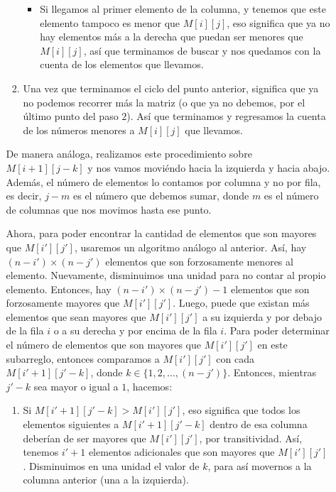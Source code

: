 \documentclass[letterpaper,11pt]{article}
\begin{document}
\begin{enumerate}
\begin{enumerate}
\begin{enumerate}
\begin{itemize}
                \item Si llegamos al primer elemento de la columna, y tenemos 
                que este elemento tampoco es menor que $M[i][j]$, eso significa 
                que ya no hay elementos más a la derecha que puedan ser menores 
                que $M[i][j]$, así que terminamos de buscar y nos quedamos con 
                la cuenta de los elementos que llevamos. 
            \end{itemize}

            \item Una vez que terminamos el ciclo del punto anterior, significa 
            que ya no podemos recorrer más la matriz (o que ya no debemos, por 
            el último punto del paso $2$). Así que terminamos y regresamos la 
            cuenta de los números menores a $M[i][j]$ que llevamos.
        \end{enumerate}

        De manera análoga, realizamos este procedimiento sobre $M[i+1][j-k]$ y
        nos vamos moviéndo hacia la izquierda y hacia abajo. Además, el número 
        de elementos lo contamos por columna y no por fila, es decir, $j-m$
        es el número que debemos sumar, donde $m$ es el número de columnas que 
        nos movimos hasta ese punto.

        Ahora, para poder encontrar la cantidad de elementos que son mayores que
        $M[i'][j']$, usaremos un algoritmo análogo al anterior. Así, hay 
        $(n-i') \times (n-j')$ elementos que son forzosamente menores al 
        elemento. Nuevamente, disminuimos una unidad para no contar al propio 
        elemento. Entonces, hay $(n-i') \times (n-j') - 1$ elementos que son 
        forzosamente mayores que $M[i'][j']$. Luego, puede que existan más 
        elementos que sean mayores que $M[i'][j']$ a su izquierda y por debajo 
        de la fila $i$ o a su derecha y por encima de la fila $i$. Para poder 
        determinar el número de elementos que son mayores que $M[i'][j']$ en 
        este subarreglo, entonces comparamos a $M[i'][j']$ con cada 
        $M[i'+1][j'-k]$, donde $k \in \{1, 2, \ldots, (n-j')\}$. Entonces, 
        mientras $j'-k$ sea mayor o igual a $1$, hacemos:  
        \begin{enumerate}
            \item Si $M[i'+1][j'-k] > M[i'][j']$, eso significa que todos los 
            elementos siguientes a $M[i'+1][j'-k]$ dentro de esa columna 
            deberían de ser mayores que $M[i'][j']$, por transitividad. Así, 
            tenemos $i'+1$ elementos adicionales que son mayores que $M[i'][j']$. 
            Disminuimos en una unidad el valor de $k$, para así movernos a la 
            columna anterior (una a la izquierda).


\end{enumerate}
\end{enumerate}
\end{enumerate}
\end{document}
